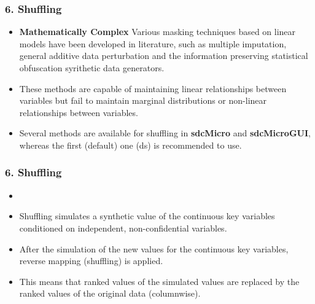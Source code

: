 \documentclass{beamer}
\begin{document}
\begin{frame}
	\frametitle{6. Shuffling}
	\begin{itemize}
\item \textbf{Mathematically Complex}
Various masking techniques based on linear models have been developed in literature, such as multiple imputation, general additive data perturbation and the information preserving statistical obfuscation syrithetic data generators.
\item These methods are capable of maintaining
linear relationships between variables but fail to maintain marginal distributions
or non-linear relationships between variables.

\item Several methods are available for shuffling in \textbf{sdcMicro} and \textbf{sdcMicroGUI}, whereas
the first (default) one (ds) is recommended to use. 

\end{itemize}
\end{frame}
\begin{frame}
	\frametitle{6. Shuffling}
	\begin{itemize}
		\item 
\item Shuffling simulates a synthetic value of the continuous key variables conditioned on independent, non-conﬁdential variables. 
\item After
the simulation of the new values for the continuous key variables, reverse mapping
(shuffling) is applied. 
\item This means that ranked values of the simulated values are
replaced by the ranked values of the original data (columnwise).

\end{itemize}
\end{frame}
\end{document}
